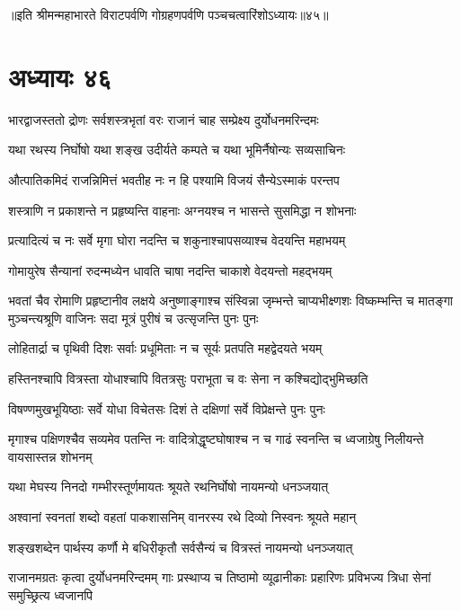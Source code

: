 ॥इति श्रीमन्महाभारते विराटपर्वणि गोग्रहणपर्वणि पञ्चचत्वारिंशोऽध्यायः॥४५॥

\chapter{अध्यायः ४६}

\twolineshloka
{भारद्वाजस्ततो द्रोणः सर्वशस्त्रभृतां वरः}
{राजानं चाह सम्प्रेक्ष्य दुर्योधनमरिन्दमः}


\twolineshloka
{यथा रथस्य निर्घोषो यथा शङ्ख उदीर्यते}
{कम्पते च यथा भूमिर्नैषोन्यः सव्यसाचिनः}


\twolineshloka
{औत्पातिकमिदं राजन्निमित्तं भवतीह नः}
{न हि पश्यामि विजयं सैन्येऽस्माकं परन्तप}


\twolineshloka
{शस्त्राणि न प्रकाशन्ते न प्रहृष्यन्ति वाहनाः}
{अग्नयश्च न भासन्ते सुसमिद्धा न शोभनाः}


\twolineshloka
{प्रत्यादित्यं च नः सर्वे मृगा घोरा नदन्ति च}
{शकुनाश्चापसव्याश्च वेदयन्ति महाभयम्}


\twolineshloka
{गोमायुरेष सैन्यानां रुदन्मध्येन धावति}
{चाषा नदन्ति चाकाशे वेदयन्तो महद्भयम्}


\onelineshloka
{भवतां चैव रोमाणि प्रहृष्टानीव लक्षये}
\threelineshloka
{अनुष्णाङ्गाश्च संस्विन्ना जृम्भन्ते चाप्यभीक्ष्णशः}
{विष्कम्भन्ति च मातङ्गा मुञ्चन्त्यश्रूणि वाजिनः}
{सदा मूत्रं पुरीषं च उत्सृजन्ति पुनः पुनः}


\twolineshloka
{लोहितार्द्रा च पृथिवी दिशः सर्वाः प्रधूमिताः}
{न च सूर्यः प्रतपति महद्वेदयते भयम्}


\twolineshloka
{हस्तिनश्चापि वित्रस्ता योधाश्चापि वितत्रसुः}
{पराभूता च वः सेना न कश्चिद्योद्भुमिच्छति}


\twolineshloka
{विषण्णमुखभूयिष्ठाः सर्वे योधा विचेतसः}
{दिशं ते दक्षिणां सर्वे विप्रेक्षन्ते पुनः पुनः}


\threelineshloka
{मृगाश्च पक्षिणश्चैव सव्यमेव पतन्ति नः}
{वादित्रोद्धृष्टघोषाश्च न च गाढं स्वनन्ति च}
{ध्वजाग्रेषु निलीयन्ते वायसास्तन्न शोभनम्}


\twolineshloka
{यथा मेघस्य निनदो गम्भीरस्तूर्णमायतः}
{श्रूयते रथनिर्घोषो नायमन्यो धनञ्जयात्}


\twolineshloka
{अश्वानां स्वनतां शब्दो वहतां पाकशासनिम्}
{वानरस्य रथे दिव्यो निस्वनः श्रूयते महान्}


\twolineshloka
{शङ्खशब्देन पार्थस्य कर्णौ मे बधिरीकृतौ}
{सर्वसैन्यं च वित्रस्तं नायमन्यो धनञ्जयात्}


\threelineshloka
{राजानमग्रतः कृत्वा दुर्योधनमरिन्दमम्}
{गाः प्रस्थाप्य च तिष्ठामो व्यूढानीकाः प्रहारिणः}
{प्रविभज्य त्रिधा सेनां समुच्छ्रित्य ध्वजानपि}


